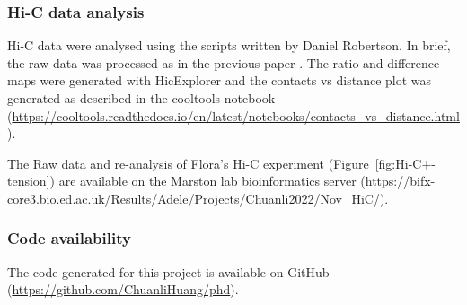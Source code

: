 
\subsubsection{Hi-C data analysis}
Hi-C data were analysed using the scripts written by Daniel Robertson. In brief, the raw data was processed as in the previous paper \citep{Paldi2020ConvergentPericentromeres}. The ratio and difference maps were generated with HicExplorer and the contacts vs distance plot was generated as described in the cooltools notebook (\url{https://cooltools.readthedocs.io/en/latest/notebooks/contacts_vs_distance.html}). 

The Raw data and re-analysis of Flora's Hi-C experiment (Figure~\ref{fig:Hi-C+-tension}) are available on the Marston lab bioinformatics server (\url{https://bifx-core3.bio.ed.ac.uk/Results/Adele/Projects/Chuanli2022/Nov_HiC/}).
\subsubsection{Code availability}
The code generated for this project is available on GitHub (\url{https://github.com/ChuanliHuang/phd}).